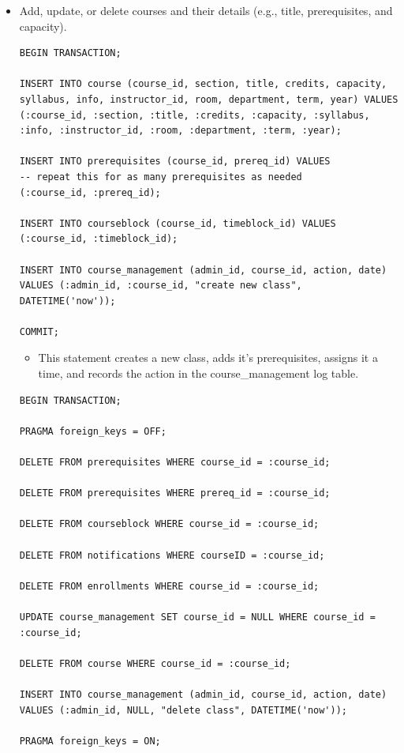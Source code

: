 \documentclass{report}
\begin{document}
\begin{itemize}
    
    \item Add, update, or delete courses and their details (e.g., title, prerequisites, and capacity).
    \begin{lstlisting}
BEGIN TRANSACTION;

INSERT INTO course (course_id, section, title, credits, capacity, syllabus, info, instructor_id, room, department, term, year) VALUES
(:course_id, :section, :title, :credits, :capacity, :syllabus, :info, :instructor_id, :room, :department, :term, :year);

INSERT INTO prerequisites (course_id, prereq_id) VALUES
-- repeat this for as many prerequisites as needed
(:course_id, :prereq_id);

INSERT INTO courseblock (course_id, timeblock_id) VALUES
(:course_id, :timeblock_id);

INSERT INTO course_management (admin_id, course_id, action, date)
VALUES (:admin_id, :course_id, "create new class", DATETIME('now'));

COMMIT;
    \end{lstlisting}
    \begin{itemize}
        \item This statement creates a new class, adds it's prerequisites, assigns it a time, and records the action in the course\_management log table.
    \end{itemize}
    \begin{lstlisting}
BEGIN TRANSACTION;

PRAGMA foreign_keys = OFF;

DELETE FROM prerequisites WHERE course_id = :course_id;

DELETE FROM prerequisites WHERE prereq_id = :course_id;

DELETE FROM courseblock WHERE course_id = :course_id;

DELETE FROM notifications WHERE courseID = :course_id;

DELETE FROM enrollments WHERE course_id = :course_id;

UPDATE course_management SET course_id = NULL WHERE course_id = :course_id;

DELETE FROM course WHERE course_id = :course_id;

INSERT INTO course_management (admin_id, course_id, action, date)
VALUES (:admin_id, NULL, "delete class", DATETIME('now'));

PRAGMA foreign_keys = ON;


\end{lstlisting}
\end{itemize}
\end{document}
